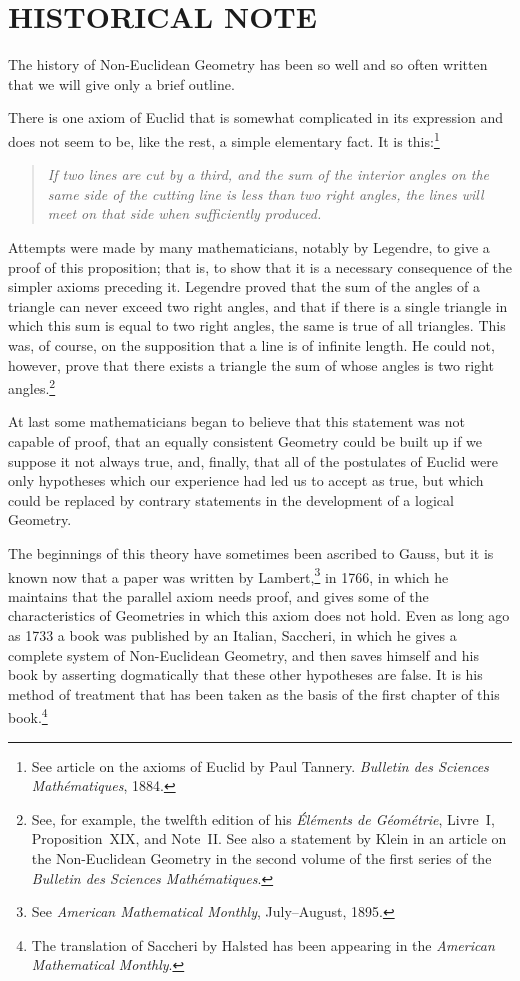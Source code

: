\chapter{HISTORICAL NOTE}

The history of Non-Euclidean Geometry has been so well and so often
written that we will give only a brief outline.\label{3hypos}

There is one axiom of Euclid that is somewhat complicated in its
expression and does not seem to be, like the rest, a simple
elementary fact. It is this:\footnote{See article on the axioms of
Euclid by Paul Tannery. \emph{Bulletin des Sciences Mathématiques},
1884.}

\begin{quotation}\emph{If two lines are cut by a third, and the sum of the
interior angles on the same side of the cutting line is less than
two right angles, the lines will meet on that side when sufficiently
produced.}\end{quotation}

Attempts were made by many mathematicians, notably by Legendre, to
give a proof of this proposition; that is, to show that it is a
necessary consequence of the simpler axioms preceding it. Legendre
proved that the sum of the angles of a triangle can never exceed two
right angles, and that if there is a single triangle in which this
sum is equal to two right angles, the same is true of all triangles.
This was, of course, on the supposition that a line is of infinite
length. He could not, however, prove that there exists a triangle
the sum of whose angles is two right angles.\footnote{See, for
example, the twelfth edition of his \emph{Éléments de Géométrie},
Livre~I, Proposition~XIX, and Note~II. See also a statement by Klein
in an article on the Non-Euclidean Geometry in the second volume of
the first series of the \emph{Bulletin des Sciences Mathématiques}.}

At last some mathematicians began to believe that this statement was
not capable of proof, that an equally consistent Geometry could be
built up if we suppose it not always true, and, finally, that all of
the postulates of Euclid were only hypotheses which our experience
had led us to accept as true, but which could be replaced by
contrary statements in the development of a logical Geometry.

The beginnings of this theory have sometimes been ascribed to Gauss,
but it is known now that a paper was written by
Lambert,\footnote{See \emph{American Mathematical Monthly},
July--August, 1895.} in 1766, in which he maintains that the
parallel axiom needs proof, and gives some of the characteristics of
Geometries in which this axiom does not hold. Even as long ago as
1733 a book was published by an Italian, Saccheri, in which he gives
a complete system of Non-Euclidean Geometry, and then saves himself
and his book by asserting dogmatically that these other hypotheses
are false. It is his method of treatment that has been taken as the
basis of the first chapter of this book.\footnote{The translation of
Saccheri by Halsted has been appearing in the \emph{American
Mathematical Monthly}.}

